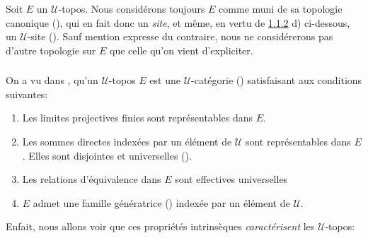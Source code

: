 \documentclass[10pt]{../fichiers-configuration-latex/smfart}
\begin{document}
\setcounter{subsection}{1}
\subsubsection{}
Soit $E$ un $𝒰$-topos. Nous considérons toujours $E$ comme
muni de sa topologie canonique (), qui en fait donc
un \emph{site}, et même, en vertu de \hyperref[IV.subsubsec1.1.2]{1.1.2} d)
ci-dessous, un $𝒰$-site (). Sauf mention
expresse du contraire, nous ne considérerons pas d'autre topologie
sur $E$ que celle qu'on vient d'expliciter.

\subsubsection{}
On a vu dans ,  qu'un
$𝒰$-topos $E$ est une $𝒰$-catégorie
() satisfaisant aux conditions suivantes:
\begin{enumerate}
\renewcommand{\theenumi}{\alph{enumi}}
\renewcommand{\labelenumi}{\theenumi)}
\item Les limites projectives finies sont représentables dans $E$.

\item Les sommes directes indexées par un élément de $𝒰$
  sont représentables dans $E$. Elles sont disjointes et
  universelles ().

\item Les relations d'équivalence dans $E$ sont effectives
  universelles 

\item $E$ admet une famille génératrice () indexée par un
  élément de $𝒰$.
\end{enumerate}

En\pageoriginale fait, nous allons voir que ces propriétés
intrinsèques \emph{caractérisent} les $𝒰$-topos:
\end{document}
